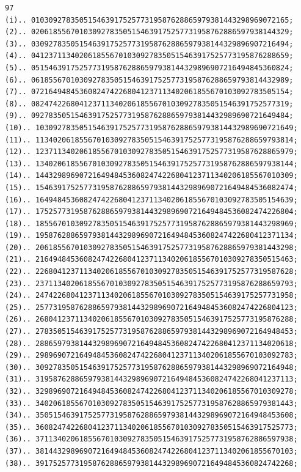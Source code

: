 \documentclass[10pt,a4paper]{article}
\begin{document}
\begin{verbatim}
97
(i).. 01030927835051546391752577319587628865979381443298969072165;
(2).. 02061855670103092783505154639175257731958762886597938144329;
(3).. 03092783505154639175257731958762886597938144329896907216494;
(4).. 04123711340206185567010309278350515463917525773195876288659;
(5).. 05154639175257731958762886597938144329896907216494845360824;
(6).. 06185567010309278350515463917525773195876288659793814432989;
(7).. 07216494845360824742268041237113402061855670103092783505154;
(8).. 08247422680412371134020618556701030927835051546391752577319;
(9).. 09278350515463917525773195876288659793814432989690721649484;
(10).. 10309278350515463917525773195876288659793814432989690721649;
(11).. 11340206185567010309278350515463917525773195876288659793814;
(12).. 12371134020618556701030927835051546391752577319587628865979;
(13).. 13402061855670103092783505154639175257731958762886597938144;
(14).. 14432989690721649484536082474226804123711340206185567010309;
(15).. 15463917525773195876288659793814432989690721649484536082474;
(16).. 16494845360824742268041237113402061855670103092783505154639;
(17).. 17525773195876288659793814432989690721649484536082474226804;
(18).. 18556701030927835051546391752577319587628865979381443298969;
(19).. 19587628865979381443298969072164948453608247422680412371134;
(20).. 20618556701030927835051546391752577319587628865979381443298;
(21).. 21649484536082474226804123711340206185567010309278350515463;
(22).. 22680412371134020618556701030927835051546391752577319587628;
(23).. 23711340206185567010309278350515463917525773195876288659793;
(24).. 24742268041237113402061855670103092783505154639175257731958;
(25).. 25773195876288659793814432989690721649484536082474226804123;
(26).. 26804123711340206185567010309278350515463917525773195876288;
(27).. 27835051546391752577319587628865979381443298969072164948453;
(28).. 28865979381443298969072164948453608247422680412371134020618;
(29).. 29896907216494845360824742268041237113402061855670103092783;
(30).. 30927835051546391752577319587628865979381443298969072164948;
(31).. 31958762886597938144329896907216494845360824742268041237113;
(32).. 32989690721649484536082474226804123711340206185567010309278;
(33).. 34020618556701030927835051546391752577319587628865979381443;
(34).. 35051546391752577319587628865979381443298969072164948453608;
(35).. 36082474226804123711340206185567010309278350515463917525773;
(36).. 37113402061855670103092783505154639175257731958762886597938;
(37).. 38144329896907216494845360824742268041237113402061855670103;
(38).. 39175257731958762886597938144329896907216494845360824742268;

\end{verbatim}
\end{document}
